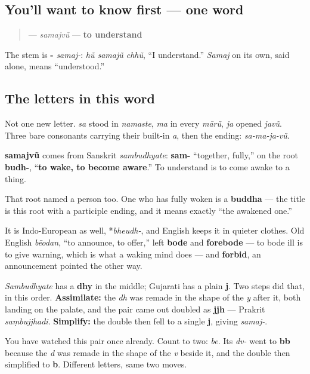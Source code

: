\subsection*{You'll want to know first — one word}
\begin{quote}
\textbf{} — \emph{samajvũ} — \textbf{to understand}
\end{quote}

The stem is \textbf{-} \emph{samaj-}: \emph{hũ samajũ chhũ}, \textquotedblleft{}I understand.\textquotedblright{} \emph{Samaj} on its own, said alone, means \textquotedblleft{}understood.\textquotedblright{}

\subsection*{The letters in this word}
Not one new letter. \textbf{} \emph{sa} stood in \emph{namaste}, \textbf{} \emph{ma} in every \emph{mārũ}, \textbf{} \emph{ja} opened \emph{javũ}. Three bare consonants carrying their built-in \emph{a}, then the ending: \emph{sa-ma-ja-vũ}.

\begin{cousinweb}
\textbf{samajvũ} comes from Sanskrit \emph{sambudhyate}: \textbf{sam-} \textquotedblleft{}together, fully,\textquotedblright{} on the root \textbf{budh-}, \textquotedblleft{}\textbf{to wake, to become aware}.\textquotedblright{} To understand is to come awake to a thing.

That root named a person too. One who has fully woken is a \textbf{buddha} — the title is this root with a participle ending, and it means exactly \textquotedblleft{}the awakened one.\textquotedblright{}

It is Indo-European as well, *\emph{bheudh-}, and English keeps it in quieter clothes. Old English \emph{bēodan}, \textquotedblleft{}to announce, to offer,\textquotedblright{} left \textbf{bode} and \textbf{forebode} — to bode ill is to give warning, which is what a waking mind does — and \textbf{forbid}, an announcement pointed the other way.
\end{cousinweb}

\begin{grammarlens}[title={What you've built: a cluster that assimilated, then simplified}]
\emph{Sambudhyate} has a \textbf{dhy} in the middle; Gujarati has a plain \textbf{j}. Two steps did that, in this order. \textbf{Assimilate:} the \emph{dh} was remade in the shape of the \emph{y} after it, both landing on the palate, and the pair came out doubled as \textbf{jjh} — Prakrit \emph{saṃbujjhadi}. \textbf{Simplify:} the double then fell to a single \textbf{j}, giving \emph{samaj-}.

You have watched this pair once already. Count to two: \emph{be}. Its \emph{dv-} went to \textbf{bb} because the \emph{d} was remade in the shape of the \emph{v} beside it, and the double then simplified to \textbf{b}. Different letters, same two moves.
\end{grammarlens}

